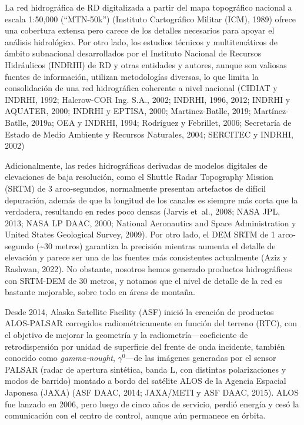 \documentclass[spanish]{article}
\begin{document}
La red hidrográfica de RD digitalizada a partir del mapa topográfico
nacional a escala 1:50,000 (``MTN-50k'') (Instituto Cartográfico Militar
(ICM), 1989) ofrece una cobertura extensa pero carece de los detalles
necesarios para apoyar el análisis hidrológico. Por otro lado, los
estudios técnicos y multitemáticos de ámbito subnacional desarrollados
por el Instituto Nacional de Recursos Hidráulicos (INDRHI) de RD y otras
entidades y autores, aunque son valiosas fuentes de información,
utilizan metodologías diversas, lo que limita la consolidación de una
red hidrográfica coherente a nivel nacional (CIDIAT y INDRHI, 1992;
Halcrow-COR Ing. S.A., 2002; INDRHI, 1996, 2012; INDRHI y AQUATER, 2000;
INDRHI y EPTISA, 2000; Martinez-Batlle, 2019; Martínez-Batlle, 2019a;
OEA y INDRHI, 1994; Rodríguez y Febrillet, 2006; Secretaría de Estado de
Medio Ambiente y Recursos Naturales, 2004; SERCITEC y INDRHI, 2002)

Adicionalmente, las redes hidrográficas derivadas de modelos digitales
de elevaciones de baja resolución, como el Shuttle Radar Topography
Mission (SRTM) de 3 arco-segundos, normalmente presentan artefactos de
difícil depuración, además de que la longitud de los canales es siempre
más corta que la verdadera, resultando en redes poco densas (Jarvis
et~al., 2008; NASA JPL, 2013; NASA LP DAAC, 2000; National Aeronautics
and Space Administration y United States Geological Survey, 2009). Por
otro lado, el DEM SRTM de 1 arco-segundo (\textasciitilde30 metros)
garantiza la precisión mientras aumenta el detalle de elevación y parece
ser una de las fuentes más consistentes actualmente (Aziz y Rashwan,
2022). No obstante, nosotros hemos generado productos hidrográficos con
SRTM-DEM de 30 metros, y notamos que el nivel de detalle de la red es
bastante mejorable, sobre todo en áreas de montaña.

Desde 2014, Alaska Satellite Facility (ASF) inició la creación de
productos ALOS-PALSAR corregidos radiométricamente en función del
terreno (RTC), con el objetivo de mejorar la geometría y la
radiometría---coeficiente de retrodispersión por unidad de superficie
del frente de onda incidente, también conocido como \emph{gamma-nought},
\(\gamma^0\)---de las imágenes generadas por el sensor PALSAR (radar de
apertura sintética, banda L, con distintas polarizaciones y modos de
barrido) montado a bordo del satélite ALOS de la Agencia Espacial
Japonesa (JAXA) (ASF DAAC, 2014; JAXA/METI y ASF DAAC, 2015). ALOS fue
lanzado en 2006, pero luego de cinco años de servicio, perdió energía y
cesó la comunicación con el centro de control, aunque aún permanece en
órbita.
\end{document}
